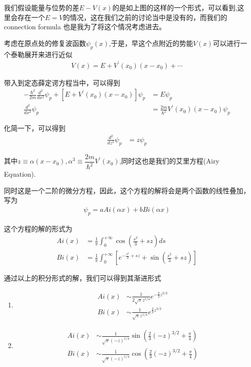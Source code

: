 \documentclass{article}
\begin{document}
我们假设能量与位势的差$E-V(x)$的是如上图的这样的一个形式，可以看到,这里会存在一个$E=V$的情况，这在我们之前的讨论当中是没有的，而我们的 connection formula 也是我为了将这个情况考虑进去。

考虑在原点处的修复波函数$\psi_p(x)$,于是，早这个点附近的势能$V(x)$可以进行一个泰勒展开来进行近似
\begin{align*}
	V(x)=E+V^\prime(x_0)(x-x_0)+\cdots
\end{align*}

带入到定态薛定谔方程当中，可以得到
\begin{align*}
	-\frac{\hbar^2}{2m}\frac{d^2}{dx^2}\psi_p+\left[E+V^\prime(x_0)(x-x_0)\right]\psi_p & =E\psi_p                                       \\
	\frac{d^2}{dx^2}\psi_p                                                              & = \frac{2m}{\hbar^2}V^\prime(x_0)(x-x_0)\psi_p
\end{align*}

化简一下，可以得到
\begin{align*}
	\frac{d^2}{dz^2}\psi_p & = z\psi_p
\end{align*}

其中$z\equiv \alpha(x-x_0),\alpha^3\equiv \dfrac{2m}{\hbar^2}V^\prime(x_0)$,同时这也是我们的艾里方程(Airy Equation).

同时这是一个二阶的微分方程，因此，这个方程的解将会是两个函数的线性叠加，写为
\begin{align*}
	\psi_p=aAi(\alpha x)+bBi(\alpha x)
\end{align*}

这个方程的解的形式为
\begin{align*}
	Ai(x) & =\frac{1}{\pi}\int_{0}^{+\infty}\cos(\frac{s^2}{3}+sz)ds                                  \\
	Bi(x) & =\frac{1}{\pi}\int_{0}^{+\infty}\left[e^{-\frac{s^2}{3}+sz}+\sin(\frac{s^2}{3}+sz)\right]
\end{align*}

通过以上的积分形式的解，我们可以得到其渐进形式
\begin{enumerate}
	\item[$z\geq  0$]
	      \begin{align*}
		      Ai(x) & \sim \frac{1}{2\sqrt{\pi}z^{1/4}}e^{-\frac{2}{3}z^{3/2}} \\
		      Bi(x) & \sim \frac{1}{\sqrt{\pi}z^{1/4}}e^{\frac{2}{3}z^{3/2}}
	      \end{align*}
	\item[$z\leq 0$]
	      \begin{align*}
		      Ai(x) & \sim \frac{1}{\sqrt{\pi}(-z)^{1/4}}\sin(\frac{2}{3}(-z)^{3/2}+\frac{\pi}{4}) \\
		      Bi(x) & \sim \frac{1}{\sqrt{\pi}(-z)^{1/4}}\cos(\frac{2}{3}(-z)^{3/2}+\frac{\pi}{4})
	      \end{align*}
\end{enumerate}
\end{document}
